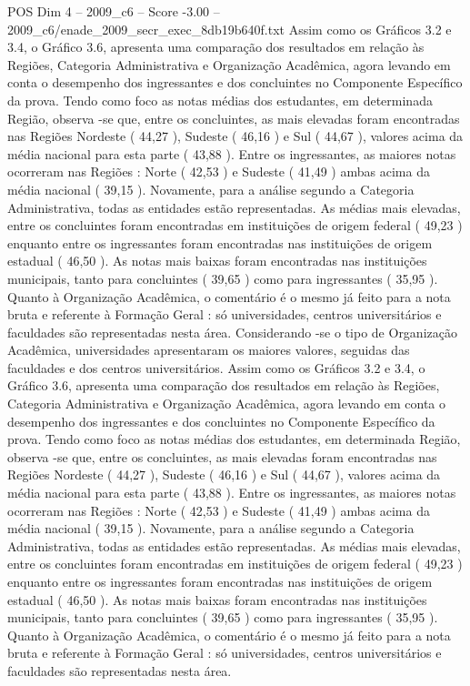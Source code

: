 \begin{textsample}{POS Dim 4 – 2009\_c6 – Score -3.00 – 2009\_c6/enade\_2009\_secr\_exec\_8db19b640f.txt}
Assim como os Gráficos 3.2 e 3.4, o Gráfico 3.6, apresenta uma comparação dos resultados em relação às Regiões, Categoria Administrativa e Organização Acadêmica, agora levando em conta o desempenho dos ingressantes e dos concluintes no Componente Específico da prova.
Tendo como foco as notas médias dos estudantes, em determinada Região, observa -se que, entre os concluintes, as mais elevadas foram encontradas nas Regiões Nordeste ( 44,27 ), Sudeste ( 46,16 ) e Sul ( 44,67 ), valores acima da média nacional para esta parte ( 43,88 ).
Entre os ingressantes, as maiores notas ocorreram nas Regiões : Norte ( 42,53 ) e Sudeste ( 41,49 ) ambas acima da média nacional ( 39,15 ).
Novamente, para a análise segundo a Categoria Administrativa, todas as entidades estão representadas.
As médias mais elevadas, entre os concluintes foram encontradas em instituições de origem federal ( 49,23 ) enquanto entre os ingressantes foram encontradas nas instituições de origem estadual ( 46,50 ).
As notas mais baixas foram encontradas nas instituições municipais, tanto para concluintes ( 39,65 ) como para ingressantes ( 35,95 ).
Quanto à Organização Acadêmica, o comentário é o mesmo já feito para a nota bruta e referente à Formação Geral : só universidades, centros universitários e faculdades são representadas nesta área.
Considerando -se o tipo de Organização Acadêmica, universidades apresentaram os maiores valores, seguidas das faculdades e dos centros universitários.
Assim como os Gráficos 3.2 e 3.4, o Gráfico 3.6, apresenta uma comparação dos resultados em relação às Regiões, Categoria Administrativa e Organização Acadêmica, agora levando em conta o desempenho dos ingressantes e dos concluintes no Componente Específico da prova.
Tendo como foco as notas médias dos estudantes, em determinada Região, observa -se que, entre os concluintes, as mais elevadas foram encontradas nas Regiões Nordeste ( 44,27 ), Sudeste ( 46,16 ) e Sul ( 44,67 ), valores acima da média nacional para esta parte ( 43,88 ).
Entre os ingressantes, as maiores notas ocorreram nas Regiões : Norte ( 42,53 ) e Sudeste ( 41,49 ) ambas acima da média nacional ( 39,15 ).
Novamente, para a análise segundo a Categoria Administrativa, todas as entidades estão representadas.
As médias mais elevadas, entre os concluintes foram encontradas em instituições de origem federal ( 49,23 ) enquanto entre os ingressantes foram encontradas nas instituições de origem estadual ( 46,50 ).
As notas mais baixas foram encontradas nas instituições municipais, tanto para concluintes ( 39,65 ) como para ingressantes ( 35,95 ).
Quanto à Organização Acadêmica, o comentário é o mesmo já feito para a nota bruta e referente à Formação Geral : só universidades, centros universitários e faculdades são representadas nesta área.

\end{textsample}
